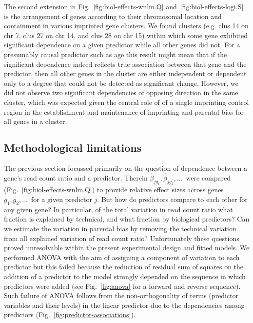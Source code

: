 \documentclass[letterpaper]{article}
\begin{document}
The second extension in Fig.~\ref{fig:biol-effects-wnlm.Q}
and~\ref{fig:biol-effects-logi.S} is the arrangement of genes according to
their chromosomal location and containment in various imprinted gene clusters.
We found clusters (e.g. clus 14 on chr 7, clus 27 on chr 14, and clus 28 on
chr 15) within which some gene exhibited significant dependence on a given
predictor while all other genes did not. For a presumably causal predictor such
as age this result might mean that if the significant dependence indeed
reflects true association between that gene and the predictor, then all other
genes in the cluster are either independent or dependent only to a degree that
could not be detected as significant change. However, we did not observe two
significant dependencies of opposing direction in the same cluster, which was
expected given the central role of of a single imprinting control region in
the establishment and maintenance of imprinting and parental bias for all
genes in a cluster.

\subsection{Methodological limitations}
\label{sec:limitations}

The previous section focussed primarily on the question of dependence between
a gene's read count ratio and a predictor.  Therein \(\hat\beta_{jg_1},
\hat\beta_{jg_2},...\)~were compared (Fig.~\ref{fig:biol-effects-wnlm.Q}) to
provide relative effect sizes across genes \(g_1, g_2,...\)~for a given
predictor \(j\). But how do predictors compare to each other for any given
gene? In particular, of the total variation in read count ratio what fraction
is explained by technical, and what fraction by biological predictors? Can we
estimate the variation in parental bias by removing the technical variation
from all explained variation of read count ratio?  Unfortunately these
questions proved unresolvable within the present experimental design and
fitted models. We performed ANOVA with the aim of assigning a component of
variation to each predictor but this failed because the reduction of residual
sum of squares on the addition of a predictor to the model strongly depended
on the sequence in which predictors were added (see Fig.~\ref{fig:anova} for a
forward and reverse sequence). Such failure of ANOVA follows from
the non-orthogonality of terms (predictor variables and their levels) in the
linear predictor due to the dependencies among predictors
(Fig.~\ref{fig:predictor-associations}).
\end{document}
